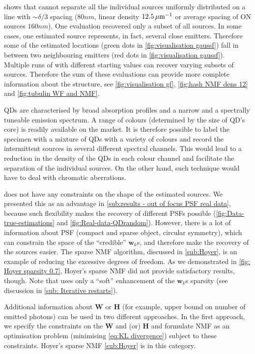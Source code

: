 \ccc{} shows that \inmf{} cannot separate all the individual sources uniformly distributed on a line with $\sim \delta/3$ spacing ($80 \unit{nm}$, linear density $12.5 \, \mathrm{\mu m}^{-1}$ or average spacing of ON sources $160 \unit{nm}$). One \inmf{} evaluation recovered only a subset of all sources. In some cases, one \inmf{} estimated source represents, in fact, several close emitters. Therefore some of the estimated locations (green dots in \autoref{fig:visualisation gaussf}\bbb) fall in between two neighbouring emitters (red dots in \autoref{fig:visualisation gaussf}\bbb). Multiple runs of \inmf{} with different starting values can recover varying subsets of sources. 
Therefore the sum of these evaluations can provide more complete information about the structure, see \autoref{fig:visualisation gf}, \ref{fig:hash NMF dens 12} and \ref{fig:tubulin WF and NMF}. 


QDs are characterised by broad absorption profiles and a narrow and a spectrally tuneable emission spectrum. A range of colours (determined by the size of QD's core) is readily available on the market. It is therefore possible to label the specimen with a mixture of QDs with a variety of colours and record the intermittent sources in several different spectral channels. This would lead to a reduction in the density of the QDs in each colour channel and facilitate the separation of the individual sources. On the other hand, such technique would have to deal with chromatic aberrations. 

\inmf{} does not have any constraints on the shape of the estimated sources. We presented this as an advantage in \autoref{sub:results - out of focus PSF real data}, because such flexibility makes the recovery of different PSFs possible (\autoref{fig:Data-true-estimations} and \ref{fig:Real-data-QDrandom}\bbb). However, there is a lot of information about PSF (compact and sparse object, circular symmetry), which can constrain the space of the ``credible'' $\bm{w}_k$s, and therefore make the recovery of the sources easier. The sparse NMF algorithm, discussed in \autoref{sub:Hoyer}, is an example of reducing the excessive degrees of freedom. As we demonstrated in \autoref{fig: Hoyer sparsity 0.7}, Hoyer's sparse NMF did not provide satisfactory results, though. Note that \inmf{} uses only a ``soft'' enhancement of the $\bm{w}_k$s sparsity  (see discussion in \autoref{sub: Iterative restarts}). 

Additional information about $\bm{W}$ or $\bm{H}$ (for example, upper bound on number of emitted photons) can be used in two different approaches. In the first approach, we specify the constraints on the $\bm{W}$ and (or) $\bm{H}$ and formulate NMF as an optimisation problem (minimising \autoref{eq:KL divergence}) subject to these constraints. Hoyer's sparse NMF \autoref{sub:Hoyer} is in this category. 


